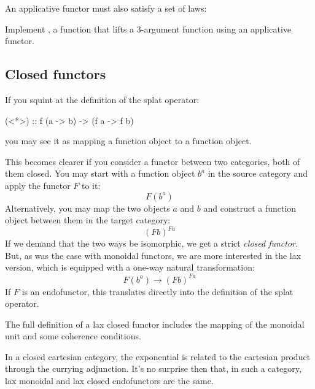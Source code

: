 \documentclass[DaoFP]{subfiles}
\begin{document}
An applicative functor must also satisfy a set of laws:

\begin{exercise}
Implement , a function that lifts a 3-argument function using an applicative functor.
\end{exercise}

\subsection{Closed functors}
If you squint at the definition of the splat operator:
\begin{haskell}
(<*>) :: f (a -> b) -> (f a -> f b)
\end{haskell}
you may see it as mapping a function object to a function object. 

This becomes clearer if you consider a functor between two categories, both of them closed. You may start with a function object $b^a$ in the source category and apply the functor $F$ to it:
\[ F (b^a) \]
Alternatively, you may map the two objects $a$ and $b$ and construct a function object between them in the target category:
\[ (F b)^{F a} \]
If we demand that the two ways be isomorphic, we get a strict \emph{closed functor}. But, as was the case with monoidal functors, we are more interested in the lax version, which is equipped with a one-way natural transformation:
\[ F (b^a) \to (F b)^{F a} \]
If $F$ is an endofunctor, this translates directly into the definition of the splat operator. 

The full definition of a lax closed functor includes the mapping of the monoidal unit and some coherence conditions. 

In a closed cartesian category, the exponential is related to the cartesian product through the currying adjunction. It's no surprise then that, in such a category, lax monoidal and lax closed endofunctors are the same. 
\end{document}
